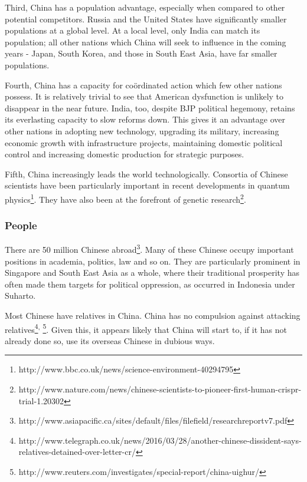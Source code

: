 Third, China has a population advantage, especially when compared to
other potential competitors. Russia and the United States have
significantly smaller populations at a global level. At a local level,
only India can match its population; all other nations which China will
seek to influence in the coming years - Japan, South Korea, and those in
South East Asia, have far smaller populations.

Fourth, China has a capacity for coördinated action which few other
nations possess. It is relatively trivial to see that American
dysfunction is unlikely to disappear in the near future. India, too,
despite BJP political hegemony, retains its everlasting capacity to slow
reforms down. This gives it an advantage over other nations in adopting
new technology, upgrading its military, increasing economic growth with
infrastructure projects, maintaining domestic political control and
increasing domestic production for strategic purposes.

Fifth, China increasingly leads the world technologically. Consortia of
Chinese scientists have been particularly important in recent
developments in quantum physics\footnote{http://www.bbc.co.uk/news/science-environment-40294795}.
They have also been at the forefront of genetic research\footnote{http://www.nature.com/news/chinese-scientists-to-pioneer-first-human-crispr-trial-1.20302}.

\subsubsection{People}\label{people}

There are 50 million Chinese abroad\footnote{http://www.asiapacific.ca/sites/default/files/filefield/researchreportv7.pdf}.
Many of these Chinese occupy important positions in academia, politics,
law and so on. They are particularly prominent in Singapore and South
East Asia as a whole, where their traditional prosperity has often made
them targets for political oppression, as occurred in Indonesia under
Suharto.

Most Chinese have relatives in China. China has no compulsion against
attacking relatives\footnote{http://www.telegraph.co.uk/news/2016/03/28/another-chinese-dissident-says-relatives-detained-over-letter-cr/}\textsuperscript{,}
\footnote{http://www.reuters.com/investigates/special-report/china-uighur/}.
Given this, it appears likely that China will start to, if it has not
already done so, use its overseas Chinese in dubious ways.

